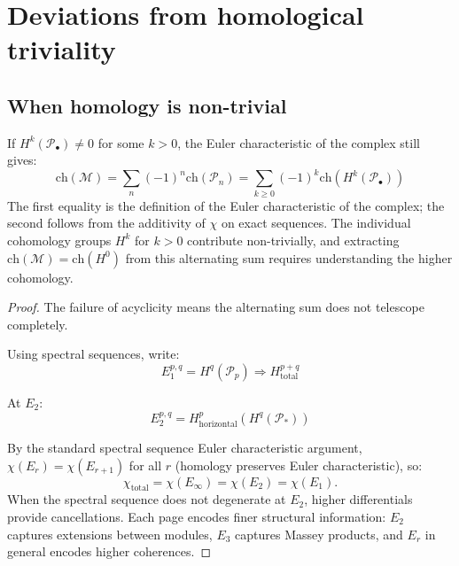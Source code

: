 \section{Deviations from homological triviality}\label{sec:deviations-triviality}

\subsection{When homology is non-trivial}

\begin{theorem}\label{thm:character-homological-corrections}
If $H^k(\mathcal{P}_\bullet) \neq 0$ for some $k > 0$, the Euler characteristic of the complex still gives:
\[
\text{ch}(\mathcal{M}) = \sum_{n} (-1)^n \text{ch}(\mathcal{P}_n) = \sum_{k \geq 0} (-1)^k \text{ch}(H^k(\mathcal{P}_\bullet))
\]
The first equality is the definition of the Euler characteristic of the
complex; the second follows from the additivity of $\chi$ on exact
sequences. The individual cohomology groups $H^k$ for $k > 0$
contribute non-trivially, and extracting
$\text{ch}(\mathcal{M}) = \text{ch}(H^0)$ from this alternating sum
requires understanding the higher cohomology.
\end{theorem}

\begin{proof}
The failure of acyclicity means the alternating sum does not telescope completely.

Using spectral sequences, write:
\[
E_1^{p,q} = H^q(\mathcal{P}_p) \Rightarrow H^{p+q}_{\text{total}}
\]

At $E_2$:
\[
E_2^{p,q} = H^p_{\text{horizontal}}(H^q(\mathcal{P}_*))
\]

By the standard spectral sequence Euler characteristic argument, $\chi(E_r) = \chi(E_{r+1})$ for all $r$ (homology preserves Euler characteristic), so:
\[
\chi_{\text{total}} = \chi(E_\infty) = \chi(E_2) = \chi(E_1).
\]
When the spectral sequence does not degenerate at $E_2$, higher differentials provide cancellations.
Each page encodes finer structural information: $E_2$ captures extensions between modules, $E_3$ captures Massey products, and $E_r$ in general encodes higher coherences.
\end{proof}

